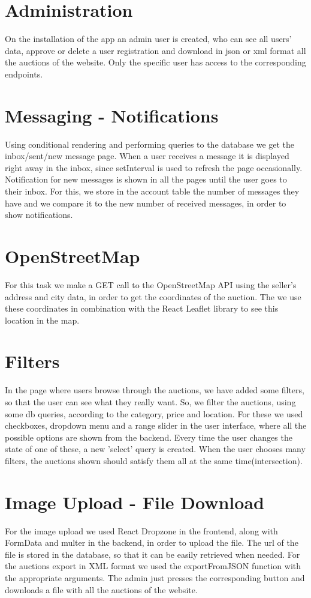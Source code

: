 \documentclass{article}
\begin{document}
\section{Administration}
On the installation of the app an admin user is created, who can see all users' data, approve or delete a user registration and download in json or xml format all the auctions of the website. Only the specific user has access to the corresponding endpoints.

\section{Messaging - Notifications}
Using conditional rendering and performing queries to the  database we get the inbox/sent/new message page. When a user receives a message it is displayed right away in the inbox, since setInterval is used to refresh the page occasionally. Notification for new messages is shown in all the pages until the user goes to their inbox. For this, we store in the account table the number of messages they have and we compare it to the new number of received messages, in order to show notifications.

\section{OpenStreetMap}
For this task we make a GET call to the OpenStreetMap API using the seller's address and city data, in order to get the coordinates of the auction. The we use these coordinates in combination with the React Leaflet library to see this location in the map. 

\section{Filters}
In the page where users browse through the auctions, we have added some filters, so that the user can see what they really want. So, we filter the auctions, using some db queries, according to the category, price and location. For these we used checkboxes, dropdown menu and a range slider in the user interface, where all the possible options are shown from the backend. Every time the user changes the state of one of these, a new 'select' query is created. When the user chooses many filters, the auctions shown should satisfy them all at the same time(intersection).

\section{Image Upload - File Download}
For the image upload we used React Dropzone in the frontend, along with FormData and multer in the backend, in order to upload the file. The url of the file is stored in the database, so that it can be easily retrieved when needed.
For the auctions export in XML format we used the exportFromJSON function with the appropriate arguments. The admin just presses the corresponding button and downloads a file with all the auctions of the website.
\end{document}
